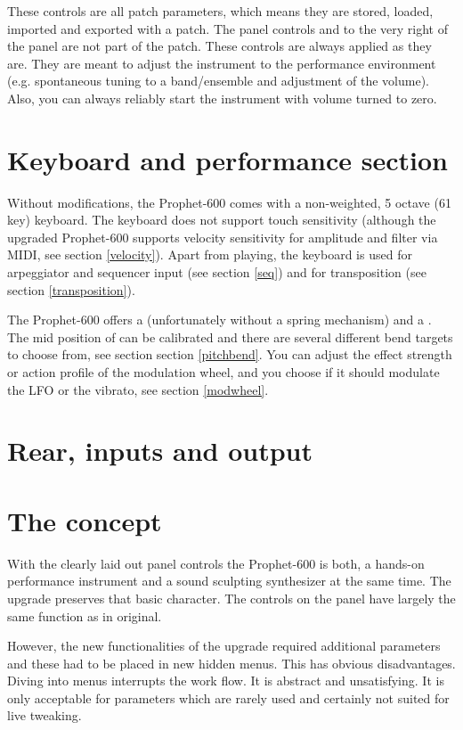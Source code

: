 \documentclass[landscape, 11pt, oneside, twoside]{report}
\newenvironment{flowtext}{\addmargin[0cm]{0cm}}{\endaddmargin} %
\begin{document}
\begin{flowtext}
These controls are all patch parameters, which means they are stored, loaded, imported and exported with a patch. The panel controls \mastertune and \mastervol to the very right of the panel are not part of the patch. These controls are always applied as they are. They are meant to adjust the instrument to the performance environment (e.g. spontaneous tuning to a band/ensemble and adjustment of the volume). Also, you can always reliably start the instrument with volume turned to zero.

\section{Keyboard and performance section}

Without modifications, the Prophet-600 comes with a non-weighted, 5 octave (61 key) keyboard. The keyboard does not support touch sensitivity (although the upgraded Prophet-600 supports velocity sensitivity for amplitude and filter via MIDI, see section \ref{velocity}). Apart from playing, the keyboard is used for arpeggiator and sequencer input (see section \ref{seq}) and for transposition (see section \ref{transposition}). 

The Prophet-600 offers a \pitchbender (unfortunately without a spring mechanism) and a \modwheel. The mid position of \pitchbender can be calibrated and there are several different bend targets to choose from, see section section \ref{pitchbend}. You can adjust the effect strength or action profile of the modulation wheel, and you choose if it should modulate the LFO or the vibrato, see section \ref{modwheel}.

\section{Rear, inputs and output}



\section{The concept}

With the clearly laid out panel controls the Prophet-600 is both, a hands-on performance instrument and a sound sculpting synthesizer at the same time. The upgrade preserves that basic character. The controls on the panel have largely the same function as in original. 

However, the new functionalities of the upgrade required additional parameters and these had to be placed in new hidden menus. This has obvious disadvantages. Diving into menus interrupts the work flow. It is abstract and unsatisfying. It is only acceptable for parameters which are rarely used and certainly not suited for live tweaking. 


\end{flowtext}
\end{document}
